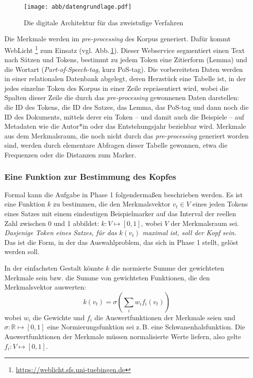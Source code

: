 \documentclass{article}
\newcommand*{\englisch}[1]{\foreignlanguage{english}{\textit{#1}}}%
\begin{document}
\begin{figure}
  \centering
  \texttt{[image: abb/datengrundlage.pdf]}
  \caption{Die digitale Architektur für das zweistufige Verfahren}
  \label{fig:Architektur}
\end{figure}

Die Merkmale werden im \englisch{pre-processing} des Korpus
generiert. Dafür kommt WebLicht%
\footnote{\url{https://weblicht.sfs.uni-tuebingen.de}} %
zum Einsatz (vgl. Abb.\,\ref{fig:Architektur}). Dieser Webservice
segmentiert einen Text nach Sätzen und Tokens, bestimmt zu jedem Token
eine Zitierform (Lemma) und die Wortart
(\englisch{Part-of-Speech-tag}, kurz PoS-tag). Die vorbereiteten Daten
werden in einer relationalen Datenbank abgelegt, deren Herzstück eine
Tabelle ist, in der jedes einzelne Token des Korpus in einer Zeile
repräsentiert wird, wobei die Spalten dieser Zeile die durch das
\englisch{pre-processing} gewonnenen Daten darstellen: die ID des
Tokens, die ID des Satzes, das Lemma, das PoS-tag und dann noch die ID
des Dokuments, mittels derer ein Token -- und damit auch die Beispiele
-- auf Metadaten wie die Autor*in oder das Entstehungsjahr beziehbar
wird. Merkmale aus dem Merkmalsraum, die noch nicht durch das
\englisch{pre-processing} generiert worden sind, werden durch
elementare Abfragen dieser Tabelle gewonnen, etwa die Frequenzen oder
die Distanzen zum Marker.


\subsubsection{Eine Funktion zur Bestimmung des Kopfes}

Formal kann die Aufgabe in Phase 1 folgendermaßen beschrieben
werden. Es ist eine Funktion $k$ zu bestimmen, die den Merkmalsvektor
$v_t\in V$ eines jeden Tokens eines Satzes mit einem eindeutigen
Beispielmarker auf das Interval der reellen Zahl zwischen 0 und 1
abbildet: $k:V \mapsto [0,1]$, wobei $V$ der Merkmalsraum
sei. \emph{Dasjenige Token eines Satzes, für das $k(v_t)$ maximal ist,
  soll der Kopf sein.} Das ist die Form, in der das Auswahlproblem,
das sich in Phase 1 stellt, gelöst werden soll.

In der einfachsten Gestalt könnte $k$ die normierte Summe der
gewichteten Merkmale sein bzw. die Summe von gewichteten Funktionen,
die den Merkmalsvektor auswerten:
\begin{equation}
\label{eq:EinfacheGewichteteSumme}
k(v_t) = \sigma \left( \sum\limits_iw_if_i(v_t) \right)
\end{equation}
wobei $w_i$ die Gewichte und $f_i$ die Auswertfunktionen der Merkmale
seien und $\sigma:\mathbb{R}\mapsto [0,1]$ eine Normierungsfunktion sei
z.\,B. eine Schwanenhalsfunktion. Die Auswertfunktionen der Merkmale
müssen normalisierte Werte liefern, also gelte $f_i:V\mapsto [0,1]$.
\end{document}
